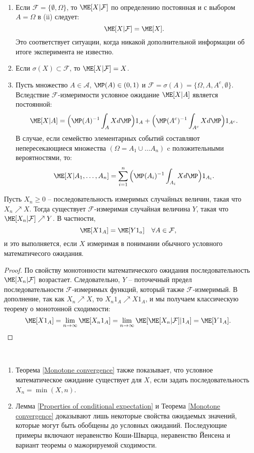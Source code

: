 \begin{exmp} \
	\begin{enumerate}
		\item Если $\mathcal{F}= \{\emptyset, \Omega \}$, то $\ME[X|\mathcal{F}]$ по определению постоянная и с выбором $A=\Omega$ в (ii) следует:
		\[\ME[X | \mathcal{F}]=\ME[X]. \]
		Это соответствует ситуации, когда никакой дополнительной информации об итоге эксперимента не известно.
		\item Если $\sigma(X) \subset \mathcal{F}$, то $\ME[X|\mathcal{F}]=X$.
		\item Пусть множество $A \in \mathcal{A}$, $\MP(A) \in (0, 1)$ и $\mathcal{F}=\sigma(A)=\{\Omega, A, A^c, \emptyset \}$. Вследствие $\mathcal{F}$-измеримости условное ожидание $\ME[X|A]$ является постоянной:
		\[\ME[X|A]=\Big(\MP(A)^{-1} \int_A X d\MP\Big)1_A + \Big(\MP(A^c)^{-1} \int_{A^c} X d\MP\Big)1_{A^c}. \]
		В случае, если семейство элементарных событий составляют непересекающиеся множества $(\Omega = A_1 \cup \dots A_n)$ c положительными вероятностями, то:
		\[\ME[X|A_1, \dots , A_n] = \sum_{i=1}^n \Big(\MP(A_i)^{-1} \int_{A_i} X d\MP\Big)1_{A_i}. \]
	\end{enumerate}
\end{exmp}

\begin{thm} \label{Monotone convergence}
	Пусть $X_n \geq 0$ -- последовательность измеримых случайных величин, такая что $X_n \nearrow X$. Тогда существует $\mathcal{F}$-измеримая случайная величина $Y$, такая что $\ME[X_n|\mathcal{F}] \nearrow Y$. В частности,
	\[ \ME[X1_A]=\ME[Y1_a] \quad \forall A \in \mathcal{F}, \]
	и это выполняется, если $X$ измеримая в понимании обычного условного математичесого ожидания.
\end{thm}

\begin{proof}
	По свойству монотонности математического ожидания последовательность $\ME[X_n|\mathcal{F}]$ возрастает. Следовательно, $Y$ -- поточечный предел последовательности $\mathcal{F}$-измеримых функций, который также $\mathcal{F}$-измеримый. В дополнение, так как $X_n \nearrow X$, то $X_n1_A \nearrow X1_A$, и мы получаем классическую теорему о монотонной сходимости:
	\[ \ME[X1_A]=\lim\limits_{n \rightarrow \infty}\ME[X_n1_A]=\lim\limits_{n \rightarrow \infty}\ME[\ME[X_n|\mathcal{F}]|1_A]=\ME[Y1_A]. \]
\end{proof}

\begin{rmrk} \
	\begin{enumerate}
		\item Теорема \ref{Monotone convergence} также показывает, что условное математическое ожидание существует для $X$, если задать последовательность $X_n=\min(X,n)$.
		\item Лемма \ref{Properties of conditional expectation} и Теорема \ref{Monotone convergence} доказывают лишь некоторые свойства ожидаемых значений, которые могут быть обобщены до условных ожиданий. Последующие примеры включают неравенство Коши-Шварца, неравенство Йенсена и вариант теоремы о мажорируемой сходимости.
	\end{enumerate}
\end{rmrk}

